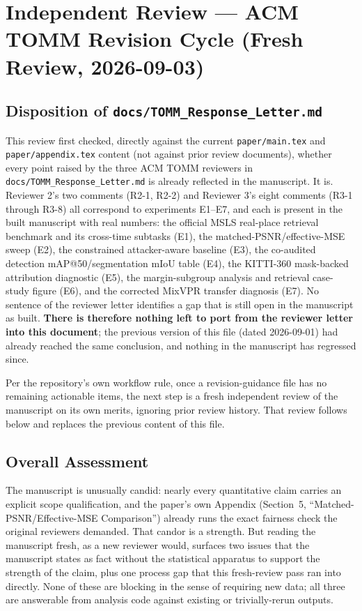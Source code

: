\documentclass[11pt]{article}
\begin{document}
\section*{Independent Review --- ACM TOMM Revision Cycle (Fresh Review, 2026-09-03)}

\subsection*{Disposition of \texttt{docs/TOMM\_Response\_Letter.md}}
This review first checked, directly against the current \texttt{paper/main.tex}
and \texttt{paper/appendix.tex} content (not against prior review documents),
whether every point raised by the three ACM TOMM reviewers in
\texttt{docs/TOMM\_Response\_Letter.md} is already reflected in the
manuscript. It is. Reviewer 2's two comments (R2-1, R2-2) and Reviewer 3's
eight comments (R3-1 through R3-8) all correspond to experiments E1--E7,
and each is present in the built manuscript with real numbers: the official
MSLS real-place retrieval benchmark and its cross-time subtasks (E1), the
matched-PSNR/effective-MSE sweep (E2), the constrained attacker-aware
baseline (E3), the co-audited detection mAP@50/segmentation mIoU table (E4),
the KITTI-360 mask-backed attribution diagnostic (E5), the margin-subgroup
analysis and retrieval case-study figure (E6), and the corrected MixVPR
transfer diagnosis (E7). No sentence of the reviewer letter identifies a gap
that is still open in the manuscript as built. \textbf{There is therefore
nothing left to port from the reviewer letter into this document}; the
previous version of this file (dated 2026-09-01) had already reached the
same conclusion, and nothing in the manuscript has regressed since.

Per the repository's own workflow rule, once a revision-guidance file has no
remaining actionable items, the next step is a fresh independent review of
the manuscript on its own merits, ignoring prior review history. That review
follows below and replaces the previous content of this file.

\subsection*{Overall Assessment}
The manuscript is unusually candid: nearly every quantitative claim carries
an explicit scope qualification, and the paper's own Appendix
(Section~5, ``Matched-PSNR/Effective-MSE Comparison'') already runs the
exact fairness check the original reviewers demanded. That candor is a
strength. But reading the manuscript fresh, as a new reviewer would, surfaces
two issues that the manuscript states as fact without the statistical
apparatus to support the strength of the claim, plus one process gap that
this fresh-review pass ran into directly. None of these are blocking in the
sense of requiring new data; all three are answerable from analysis code
against existing or trivially-rerun outputs.
\end{document}
